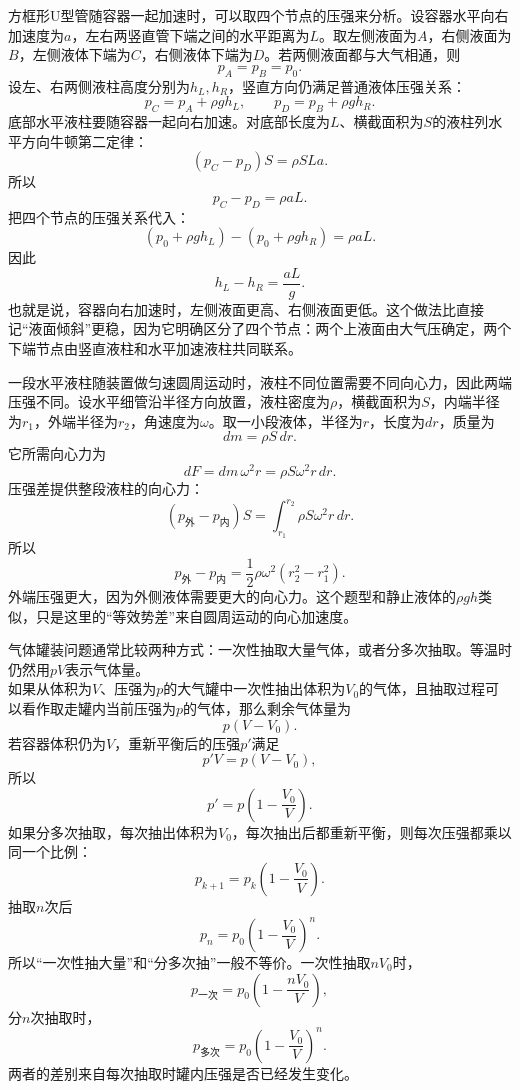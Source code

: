 \begin{casetypebox}[title={\strut\textcolor{white}{\bfseries 常见题型：方框U型液柱加速度}}]
方框形U型管随容器一起加速时，可以取四个节点的压强来分析。设容器水平向右加速度为$a$，左右两竖直管下端之间的水平距离为$L$。取左侧液面为$A$，右侧液面为$B$，左侧液体下端为$C$，右侧液体下端为$D$。若两侧液面都与大气相通，则
\[
  p_A=p_B=p_0.
\]
设左、右两侧液柱高度分别为$h_L,h_R$，竖直方向仍满足普通液体压强关系：
\[
  p_C=p_A+\rho gh_L,
  \qquad
  p_D=p_B+\rho gh_R.
\]
底部水平液柱要随容器一起向右加速。对底部长度为$L$、横截面积为$S$的液柱列水平方向牛顿第二定律：
\[
  (p_C-p_D)S=\rho S L a.
\]
所以
\[
  p_C-p_D=\rho aL.
\]
把四个节点的压强关系代入：
\[
  (p_0+\rho gh_L)-(p_0+\rho gh_R)=\rho aL.
\]
因此
\[
  h_L-h_R=\frac{aL}{g}.
\]
也就是说，容器向右加速时，左侧液面更高、右侧液面更低。这个做法比直接记“液面倾斜”更稳，因为它明确区分了四个节点：两个上液面由大气压确定，两个下端节点由竖直液柱和水平加速液柱共同联系。
\end{casetypebox}

\begin{casetypebox}[title={\strut\textcolor{white}{\bfseries 常见题型：水平液柱的匀速圆周运动}}]
一段水平液柱随装置做匀速圆周运动时，液柱不同位置需要不同向心力，因此两端压强不同。设水平细管沿半径方向放置，液柱密度为$\rho$，横截面积为$S$，内端半径为$r_1$，外端半径为$r_2$，角速度为$\omega$。取一小段液体，半径为$r$，长度为$dr$，质量为
\[
  dm=\rho S\,dr.
\]
它所需向心力为
\[
  dF=dm\,\omega^2r=\rho S\omega^2r\,dr.
\]
压强差提供整段液柱的向心力：
\[
  (p_{\text{外}}-p_{\text{内}})S
  =\int_{r_1}^{r_2}\rho S\omega^2r\,dr.
\]
所以
\[
  p_{\text{外}}-p_{\text{内}}
  =\frac12\rho\omega^2(r_2^2-r_1^2).
\]
外端压强更大，因为外侧液体需要更大的向心力。这个题型和静止液体的$\rho gh$类似，只是这里的“等效势差”来自圆周运动的向心加速度。
\end{casetypebox}

\begin{casetypebox}[title={\strut\textcolor{white}{\bfseries 常见题型：气体罐装问题}}]
气体罐装问题通常比较两种方式：一次性抽取大量气体，或者分多次抽取。等温时仍然用$pV$表示气体量。\\
如果从体积为$V$、压强为$p$的大气罐中一次性抽出体积为$V_0$的气体，且抽取过程可以看作取走罐内当前压强为$p$的气体，那么剩余气体量为
\[
  p(V-V_0).
\]
若容器体积仍为$V$，重新平衡后的压强$p'$满足
\[
  p'V=p(V-V_0),
\]
所以
\[
  p'=p\left(1-\frac{V_0}{V}\right).
\]
如果分多次抽取，每次抽出体积为$V_0$，每次抽出后都重新平衡，则每次压强都乘以同一个比例：
\[
  p_{k+1}=p_k\left(1-\frac{V_0}{V}\right).
\]
抽取$n$次后
\[
  p_n=p_0\left(1-\frac{V_0}{V}\right)^n.
\]
所以“一次性抽大量”和“分多次抽”一般不等价。一次性抽取$nV_0$时，
\[
  p_{\text{一次}}=p_0\left(1-\frac{nV_0}{V}\right),
\]
分$n$次抽取时，
\[
  p_{\text{多次}}=p_0\left(1-\frac{V_0}{V}\right)^n.
\]
两者的差别来自每次抽取时罐内压强是否已经发生变化。
\end{casetypebox}


